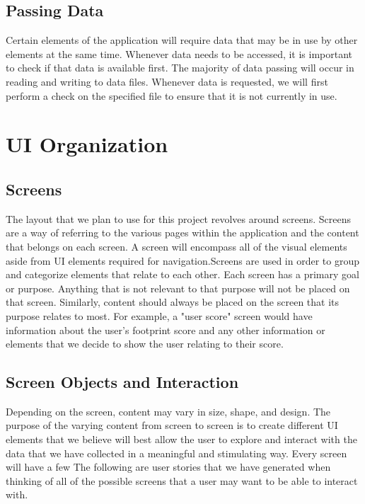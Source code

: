 \documentclass[onecolumn, draftclsnofoot,10pt, compsoc, tikz]{IEEEtran}
\begin{document}
\subsection{Passing Data}
Certain elements of the application will require data that may be in use by other elements at the same time. Whenever data needs to be accessed, it is important to check if that data is available first. The majority of data passing will occur in reading and writing to data files. Whenever data is requested, we will first perform a check on the specified file to ensure that it is not currently in use. 


\clearpage
\section{UI Organization}
\subsection{Screens}
The layout that we plan to use for this project revolves around screens. Screens are a way of referring to the various pages within the application and the content that belongs on each screen. A screen will encompass all of the visual elements aside from UI elements required for navigation.Screens are used in order to group and categorize elements that relate to each other. Each screen has a primary goal or purpose. Anything that is not relevant to that purpose will not be placed on that screen. Similarly, content should always be placed on the screen that its purpose relates to most. For example, a "user score" screen would have information about the user's footprint score and any other information or elements that we decide to show the user relating to their score. 


\subsection{Screen Objects and Interaction}
Depending on the screen, content may vary in size, shape, and design. The purpose of the varying content from screen to screen is to create different UI elements that we believe will best allow the user to explore and interact with the data that we have collected in a meaningful and stimulating way. Every screen will have a few The following are user stories that we have generated when thinking of all of the possible screens that a user may want to be able to interact with.
\end{document}
